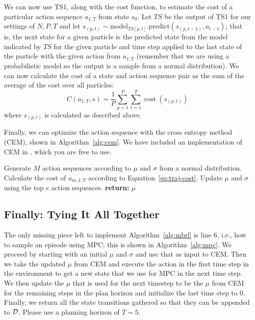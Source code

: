 \documentclass[11pt]{article}
\begin{document}
We can now use TS1, along with the cost function, to estimate the cost of a particular action sequence $a_{1:T}$ from state $s_0$. Let $TS$ be the output of TS1 for our settings of $N, P, T$ and let $s_{(p,t)} \sim \text{model}_{TS[p,t]}.\text{predict}(s_{(p,t-1)}, a_{t-1})$; that is, the next state for a given particle is the predicted state from the model indicated by $TS$ for the given particle and time step applied to the last state of the particle with the given action from $a_{1:T}$ (remember that we are using a probabilistic model so the output is a sample from a normal distribution). We can now calculate the cost of a state and action sequence pair as the sum of the average of the cost over all particles:
\begin{equation}\label{eq:traj-cost}
  C(a_{1:T}, s) = \frac{1}{P}\sum_{p=1}^{P}\sum_{t=1}^{T}\operatorname{cost}(s_{(p,t)})
\end{equation}
where $s_{(p,t)}$ is calculated as described above.

Finally, we can optimize the action sequence with the cross entropy method (CEM), shown in Algorithm~\ref{alg:cem}. We have included an implementation of CEM in , which you are free to use.

\begin{algorithm}[H]
\caption{CEM}\label{alg:cem}
\begin{algorithmic}[1]
    \State Generate $M$ action sequences according to $\mu$ and $\sigma$ from a normal distribution.
      \State Calculate the cost of $a_{m,1:T}$ according to Equation~\ref{eq:traj-cost}.
    \EndFor
    \State Update $\mu$ and $\sigma$ using the top $e$ action sequences.
  \EndFor
  \State \textbf{return:} $\mu$
\EndProcedure
\end{algorithmic}
\end{algorithm}

\subsection*{Finally: Tying It All Together}
The only missing piece left to implement Algorithm~\ref{alg:mbrl} is line 6, i.e., how to sample an episode using MPC; this is shown in Algorithm~\ref{alg:mpc}. We proceed by starting with an initial $\mu$ and $\sigma$ and use that as input to CEM. Then we take the updated $\mu$ from CEM and execute the action in the first time step in the environment to get a new state that we use for MPC in the next time step. We then update the $\mu$ that is used for the next timestep to be the $\mu$ from CEM for the remaining steps in the plan horizon and initialize the last time step to 0. Finally, we return all the state transitions gathered so that they can be appended to $\mathcal{D}$. Please use a planning horizon of $T = 5$.
\end{document}
